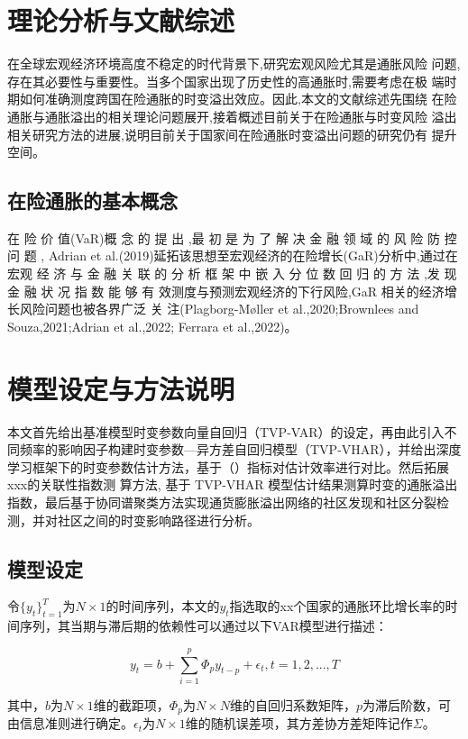 \documentclass[12pt,a4paper]{article}
\begin{document}
\section{理论分析与文献综述}

在全球宏观经济环境高度不稳定的时代背景下,研究宏观风险尤其是通胀风险  问题,存在其必要性与重要性。当多个国家出现了历史性的高通胀时,需要考虑在极  端时期如何准确测度跨国在险通胀的时变溢出效应。因此,本文的文献综述先围绕  在险通胀与通胀溢出的相关理论问题展开,接着概述目前关于在险通胀与时变风险  溢出相关研究方法的进展,说明目前关于国家间在险通胀时变溢出问题的研究仍有  提升空间。

\subsection{在险通胀的基本概念}
在 险 价 值(VaR)概 念 的 提 出 ,最 初 是 为 了 解 决 金 融 领 域 的 风 险 防 控 问 题 ,  Adrian et al.(2019)延拓该思想至宏观经济的在险增长(GaR)分析中,通过在宏观  经 济 与 金 融 关 联 的 分 析 框 架 中 嵌 入 分 位 数 回 归 的 方 法 ,发 现 金 融 状 况 指 数 能 够 有  效测度与预测宏观经济的下行风险,GaR 相关的经济增长风险问题也被各界广泛  关 注(Plagborg-Møller et al.,2020;Brownlees and Souza,2021;Adrian et al.,2022;  Ferrara et al.,2022)。

\section{模型设定与方法说明}

本文首先给出基准模型时变参数向量自回归（TVP-VAR）的设定，再由此引入不同频率的影响因子构建时变参数—异方差自回归模型（TVP-VHAR），并给出深度学习框架下的时变参数估计方法，基于（）指标对估计效率进行对比。然后拓展xxx的关联性指数测  算方法,
基于 TVP-VHAR 模型估计结果测算时变的通胀溢出指数，最后基于协同谱聚类方法实现通货膨胀溢出网络的社区发现和社区分裂检测，并对社区之间的时变影响路径进行分析。

\subsection{模型设定}
令$\{y_t\}_{t=1}^T$为$N \times 1$的时间序列，本文的$y_t$指选取的xx个国家的通胀环比增长率的时间序列，其当期与滞后期的依赖性可以通过以下VAR模型进行描述：

\begin{equation}
    y_t = b + \sum_{i=1}^{p} \Phi_{p} y_{t-p} + \epsilon_t,t=1,2,...,T
\end{equation}

其中，$b$为$N \times 1$维的截距项，$\Phi_{p}$为$N \times N$维的自回归系数矩阵，$p$为滞后阶数，可由信息准则进行确定。$\epsilon_t$为$N \times 1$维的随机误差项，其方差协方差矩阵记作$\Sigma$。
\end{document}
